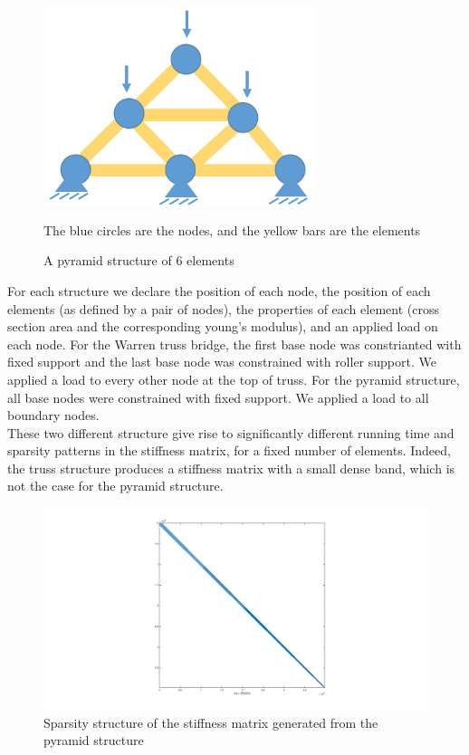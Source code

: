 \documentclass[11pt]{article}
\begin{document}
\begin{figure}[h]
\begin{center}

\includegraphics[width=8cm]{pyramid}
\caption{A pyramid structure of 6 elements}
\label{fig:pyramid}
The blue circles are the nodes, and the yellow bars are the elements
\end{center}

\end{figure}


For each structure we declare the position of each node, the position of each elements (as defined by a pair of nodes), the properties of each element (cross section area and the corresponding young's modulus), and an applied load on each node. For the Warren truss bridge, the first base node was constrianted with fixed support and the last base node was constrained with roller support. We applied a load to every other node at the top of truss. For the pyramid structure, all base nodes were constrained with fixed support. We applied a load to all boundary nodes.\\

These two different structure give rise to significantly different running time and sparsity patterns in the stiffness matrix, for a fixed number of elements. Indeed, the truss structure produces a stiffness matrix with a small dense band, which is not the case for the pyramid structure.

\begin{figure}[H]
\begin{center}
\includegraphics[width=15cm]{pyramid-sparsity.png}
\caption{Sparsity structure of the stiffness matrix generated from the pyramid structure}
\label{fig:pyramid-sparsity}
\end{center}

\end{figure}
\end{document}
